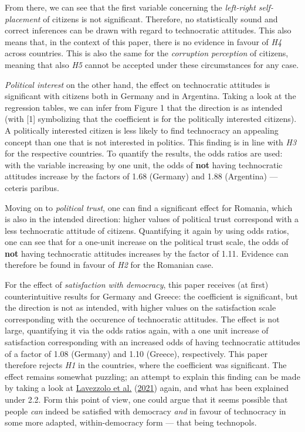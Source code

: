 \documentclass[
  12pt,
  english,
]{article}
\begin{document}
From there, we can see that the first variable concerning the
\emph{left-right self-placement} of citizens is not significant.
Therefore, no statistically sound and correct inferences can be drawn
with regard to technocratic attitudes. This also means that, in the
context of this paper, there is no evidence in favour of \emph{H4}
across countries. This is also the same for the \emph{corruption
perception} of citizens, meaning that also \emph{H5} cannot be accepted
under these circumstances for any case.

\emph{Political interest} on the other hand, the effect on technocratic
attitudes is significant with citizens both in Germany and in Argentina.
Taking a look at the regression tables, we can infer from Figure 1 that
the direction is as intended (with {[}1{]} symbolizing that the
coefficient is for the politically interested citizens). A politically
interested citizen is less likely to find technocracy an appealing
concept than one that is not interested in politics. This finding is in
line with \emph{H3} for the respective countries. To quantify the
results, the odds ratios are used: with the variable increasing by one
unit, the odds of \textbf{not} having technocratic attitudes increase by
the factors of 1.68 (Germany) and 1.88 (Argentina) --- ceteris paribus.

Moving on to \emph{political trust}, one can find a significant effect
for Romania, which is also in the intended direction: higher values of
political trust correspond with a less technocratic attitude of
citizens. Quantifying it again by using odds ratios, one can see that
for a one-unit increase on the political trust scale, the odds of
\textbf{not} having technocratic attitudes increases by the factor of
1.11. Evidence can therefore be found in favour of \emph{H2} for the
Romanian case.

For the effect of \emph{satisfaction with democracy}, this paper
receives (at first) counterintuitive results for Germany and Greece: the
coefficient is significant, but the direction is not as intended, with
higher values on the satisfaction scale corresponding with the occurence
of technocratic attitudes. The effect is not large, quantifying it via
the odds ratios again, with a one unit increase of satisfaction
corresponding with an increased odds of having technocratic attitudes of
a factor of 1.08 (Germany) and 1.10 (Greece), respectively. This paper
therefore rejects \emph{H1} in the countries, where the coefficient was
significant. The effect remains somewhat puzzling; an attempt to explain
this finding can be made by taking a look at
\protect\hyperlink{ref-lavezzolo2021will}{Lavezzolo et al.}
(\protect\hyperlink{ref-lavezzolo2021will}{2021}) again, and what has
been explained under 2.2. Form this point of view, one could argue that
it seems possible that people \emph{can} indeed be satisfied with
democracy \emph{and} in favour of technocracy in some more adapted,
within-democracy form --- that being technopols.
\end{document}
